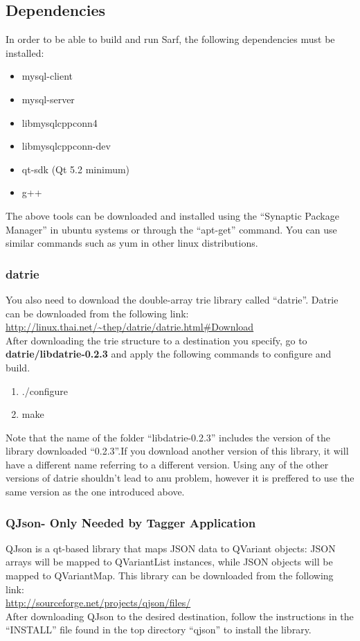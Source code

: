 \documentclass{article}
\begin{document}
\subsection{Dependencies}
\label{subsec:dependencies}
In order to be able to build and run Sarf, the following dependencies must be installed:
\begin{itemize}
\item mysql-client
\item mysql-server
\item libmysqlcppconn4
\item libmysqlcppconn-dev
\item qt-sdk (Qt 5.2 minimum) 
\item g++
\end{itemize}


The above tools can be downloaded and installed using the ``Synaptic Package Manager'' in ubuntu systems or through the ``apt-get'' command. You can use similar commands such as yum in other linux distributions.
\subsubsection{datrie}
You also need to download the double-array trie library called ``datrie''. Datrie can be downloaded from the following link:\\
\url{http://linux.thai.net/~thep/datrie/datrie.html#Download }\\
After downloading the trie structure to a destination you specify, go to {\bf datrie/libdatrie-0.2.3} and apply the following commands to configure and build.
\begin{enumerate}
\item ./configure
\item make
\end{enumerate}

Note that the name of the folder ``libdatrie-0.2.3'' includes the version of the library downloaded ``0.2.3''.If you download another version of this library, it will have a different name referring to a different version. Using any of the other versions of datrie shouldn't lead to anu problem, however it is preffered to use the same version as the one introduced above.

\subsubsection{QJson- Only Needed by Tagger Application}
QJson is a qt-based library that maps JSON data to QVariant objects: JSON arrays will be mapped to QVariantList instances, while JSON objects will be mapped to QVariantMap. This library can be downloaded from the following link:\\
\url{http://sourceforge.net/projects/qjson/files/}\\
After downloading QJson to the desired destination, follow the instructions in the ``INSTALL'' file found in the top directory ``qjson'' to install the library.
\end{document}
